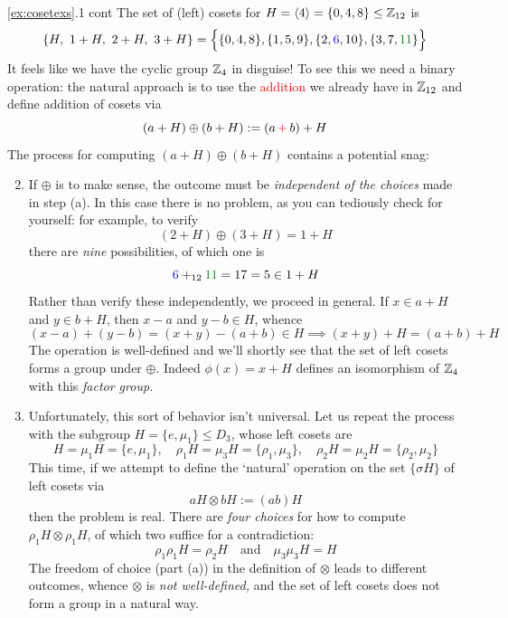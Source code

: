 \begin{examples*}{\ref{ex:cosetexs}.1 cont}{}
\exstart The set of (left) cosets for $H=\left\langle 4\right\rangle=\{0,4,8\}\le\mathbb{Z}_{12}$ is
	\[\{H,\ 1+H,\ 2+H,\ 3+H\}=\Bigl\{\{0,4,8\},\{1,5,9\},\{2,\textcolor{blue}{6},10\},\{3,7,\textcolor{Green}{11}\}\Bigr\}\]
	It feels like we have the cyclic group $\mathbb{Z}_4$ in disguise! To see this we need a binary operation: the natural approach is to use the \textcolor{red}{addition} we already have in $\mathbb{Z}_{12}$ and define addition of cosets via
	\[(a+H)\oplus(b+H):=(a\operatorname{\textcolor{red}{+}}b)+H\]
	The process for computing $(a+H)\oplus(b+H)$ contains a potential snag:\vspace{-5pt}
\begin{enumerate}\setcounter{enumi}{1}
  \item[]
	If $\oplus$ is to make sense, the outcome must be \emph{independent of the choices} made in step (a). In this case there is no problem, as you can tediously check for yourself: for example, to verify
\[(2+H)\oplus(3+H)=1+H\]
there are \emph{nine} possibilities, of which one is
\[\textcolor{blue}{6}+_{12}\textcolor{Green}{11}=17=5\in 1+H\]
Rather than verify these independently, we proceed in general. If $x\in a+H$ and $y\in b+H$, then $x-a$ and $y-b\in H$, whence
\[(x-a)+(y-b)=(x+y)-(a+b)\in H\implies (x+y)+H=(a+b)+H\]
The operation is well-defined and we'll shortly see that the set of left cosets forms a group under $\oplus$. Indeed $\phi(x)=x+H$ defines an isomorphism of $\mathbb{Z}_4$ with this \emph{factor group.}

	\item Unfortunately, this sort of behavior isn't universal. Let us repeat the process with the subgroup $H=\{e,\mu_1\}\le D_3$, whose left cosets are
\[H=\mu_1H=\{e,\mu_1\},\quad
\rho_1H=\mu_3H=\{\rho_1,\mu_3\},\quad
\rho_2H=\mu_2H=\{\rho_2,\mu_2\}\]
This time, if we attempt to define the `natural' operation on the set $\{\sigma H\}$ of left cosets via
\[aH\otimes bH:=(ab)H\]
then the problem is real. There are \emph{four choices} for how to compute $\rho_1H\otimes\rho_1H$, of which two suffice for a contradiction:
\[\rho_1\rho_1H=\rho_2H\quad\text{and}\quad \mu_3\mu_3H=H\]
The freedom of choice (part (a)) in the definition of $\otimes$ leads to different outcomes, whence $\otimes$ is \emph{not well-defined,} and the set of left cosets does not form a group in a natural way.
\end{enumerate}
\end{examples*}




